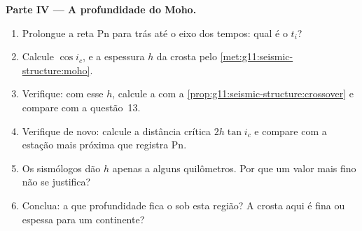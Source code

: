 \begin{problem}
\medskip
\noindent\textbf{Parte IV --- A profundidade do Moho.}
\begin{enumerate}[resume]
  \item Prolongue a reta Pn para trás até o eixo dos tempos: qual é o  $t_i$?
  \item Calcule $\cos i_c$, e a espessura $h$ da crosta pelo
        \cref{met:g11:seismic-structure:moho}.
  \item Verifique: com esse $h$, calcule a  com a
        \cref{prop:g11:seismic-structure:crossover} e compare com a
        questão~13.
  \item Verifique de novo: calcule a distância crítica $2h\tan i_c$ e compare
        com a estação mais próxima que registra Pn.
  \item Os sismólogos dão $h$ apenas a alguns quilômetros. Por que um valor
        mais fino não se justifica?
  \item Conclua: a que profundidade fica o  sob esta região? A crosta
        aqui é fina ou espessa para um continente?
\end{enumerate}
\end{problem}

